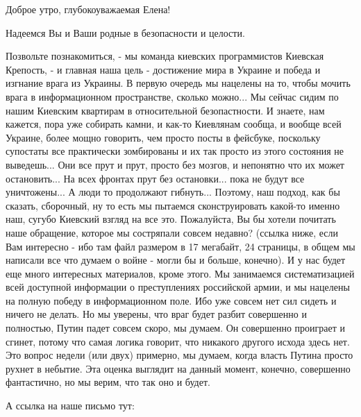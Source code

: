  
 
 
 
 

Доброе утро, глубокоуважаемая Елена!

Надеемся Вы и Ваши родные в безопасности и целости.

Позвольте познакомиться, - мы команда киевских программистов Киевская Крепость,
- и главная наша цель - достижение мира в Украине и победа и изгнание врага из
Украины. В первую очередь мы нацелены на то, чтобы мочить врага в
информационном пространстве, сколько можно... Мы сейчас сидим по нашим Киевским
квартирам в относительной безопастности.  И знаете, нам кажется, пора уже
собирать камни, и как-то Киевлянам сообща, и вообще всей Украине, более мощно
говорить, чем просто посты в фейсбуке, поскольку супостаты все практически
зомбированы и их так просто из этого состояния не выведешь... Они все прут и
прут, просто без мозгов, и непонятно что их может остановить... На всех фронтах
прут без остановки... пока не будут все уничтожены...  А люди то продолжают
гибнуть...  Поэтому, наш подход, как бы сказать, сборочный, ну то есть мы
пытаемся сконструировать какой-то именно наш, сугубо Киевский взгляд на все
это.  Пожалуйста, Вы бы хотели почитать наше обращение, которое мы состряпали
совсем недавно? (ссылка ниже, если Вам интересно - ибо там файл размером в 17
мегабайт, 24 страницы, в общем мы написали все что думаем о войне - могли бы и
больше, конечно). И у нас будет еще много интересных материалов, кроме этого.
Мы занимаемся систематизацией всей доступной информации о преступлениях
российской армии, и мы нацелены на полную победу в информационном поле. Ибо уже
совсем нет сил сидеть и ничего не делать. Но мы уверены, что враг будет разбит
совершенно и полностью, Путин падет совсем скоро, мы думаем.  Он совершенно
проиграет и сгинет, потому что самая логика говорит, что никакого другого
исхода здесь нет. Это вопрос недели (или двух) примерно, мы думаем, когда
власть Путина просто рухнет в небытие.  Эта оценка выглядит на данный момент,
конечно, совершенно фантастично, но мы верим, что так оно и будет.

А ссылка на наше письмо тут:

